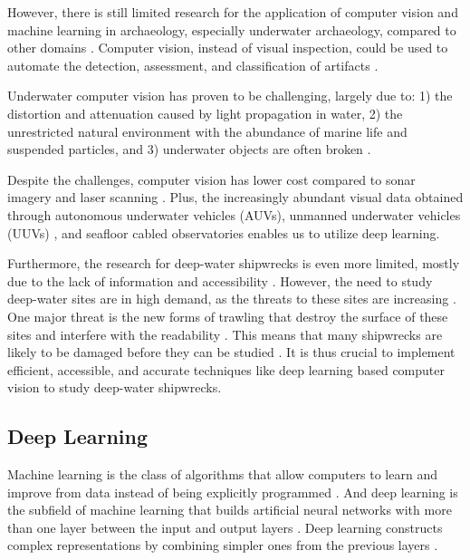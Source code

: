 \documentclass[a4paper,11pt,oneside]{article}
\begin{document}
  However, there is still limited research for the application of computer vision and machine learning in archaeology,
  especially underwater archaeology, compared to other domains \cite{maaten2007computer, qin2015underwater}.
  Computer vision, instead of visual inspection, could be used to automate the detection, assessment, and classification
  of artifacts \cite{maaten2007computer}.

  Underwater computer vision has proven to be challenging, largely due to: 1) the distortion and attenuation caused by
  light propagation in water, 2) the unrestricted natural environment with the abundance of marine life and suspended
  particles, and 3) underwater objects are often broken
  \cite{qin2015underwater, rizzini2015investigation, lu2017underwater, mccarthy20193d}.

  Despite the challenges, computer vision has lower cost \cite{rizzini2015investigation} compared to sonar imagery
  \cite{abu2019statistically} and laser scanning \cite{gordon1992use}. Plus, the increasingly abundant visual data obtained
  through autonomous underwater vehicles (AUVs), unmanned underwater vehicles (UUVs)
  \cite{lu2017underwater, moniruzzaman2017deep}, and seafloor cabled observatories \cite{qin2015underwater} enables us
  to utilize deep learning.

  Furthermore, the research for deep-water shipwrecks is even more limited, mostly due to the lack of information and
  accessibility \cite{drap2015underwater}. However, the need to study deep-water sites are in high demand, as the threats
  to these sites are increasing \cite{drap2015underwater}. One major threat is the new forms of trawling that destroy the
  surface of these sites and interfere with the readability \cite{drap2015underwater}. This means that many
  shipwrecks are likely to be damaged before they can be studied \cite{drap2015underwater}. It is thus crucial to implement
  efficient, accessible, and accurate techniques like deep learning based computer vision to study deep-water shipwrecks.

  \subsection{Deep Learning}

  Machine learning is the class of algorithms that allow computers to learn and improve from data instead of being
  explicitly programmed \cite{samuel1959some, geron2019hands}. And deep learning is the subfield of machine learning that
  builds artificial neural networks with more than one layer between the input and output layers
  \cite{geron2019hands, burkov2019hundred, zhang2018definition}. Deep learning constructs complex representations by
  combining simpler ones from the previous layers \cite{goodfellow2016deep}.
\end{document}
